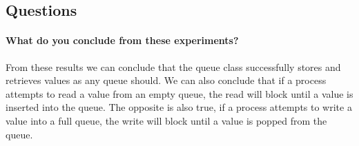 \subsection{Questions}

\paragraph{What do you conclude from these experiments?}

From these results we can conclude that the queue class successfully stores and retrieves values as any queue should.  We can also conclude that if a process attempts to read a value from an empty queue, the read will block until a value is inserted into the queue.  The opposite is also true, if a process attempts to write a value into a full queue, the write will block until a value is popped from the queue.
